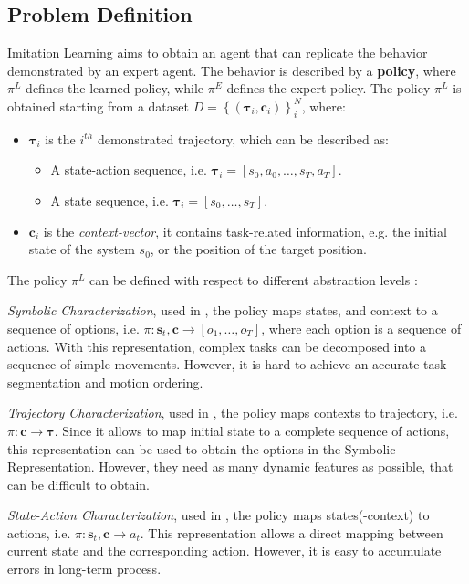 \subsection{Problem Definition}
\label{sec:problem_formulation}
Imitation Learning aims to obtain an agent that can replicate the behavior demonstrated by an expert agent. The behavior is described by a \textbf{policy}, where $\pi^{L}$ defines the learned policy, while $\pi^{E}$ defines the expert policy.
\newline The policy $\pi^{L}$ is obtained starting from a dataset $D=\left \{ \left ( \boldsymbol{\tau}_{i}, \boldsymbol{c}_{i}\right ) \right \}_{i}^{N}$, where:
\begin{itemize}
    \item $\boldsymbol{\tau}_{i}$ is the $i^{th}$ demonstrated trajectory, which can be described as:
        \begin{itemize}
            \item A state-action sequence, i.e. $\boldsymbol{\tau}_{i} = [s_{0}, a_{0}, \dots, s_{T}, a_{T}]$.
            \item A state sequence, i.e. $\boldsymbol{\tau}_{i} = [s_{0}, \dots, s_{T}]$.
        \end{itemize}    
    \item $\boldsymbol{c}_{i}$ is the \textit{context-vector}, it contains task-related information, e.g. the initial state of the system $s_{0}$, or the position of the target position.
\end{itemize}
The policy $\pi^{L}$ can be defined with respect to different abstraction levels \cite{fang2019survey,osa2018algorithmic}:   
\begin{enumerate*}[label=(\textbf{\alph*})]
    \item \textit{Symbolic Characterization}, used in \cite{}, the policy maps states, and context to a sequence of options, i.e. $\pi: \textbf{s}_{t}, \textbf{c} \rightarrow [o_1, \dots, o_T]$, where each option is a sequence of actions. With this representation, complex tasks can be decomposed into a sequence of simple movements. However, it is hard to achieve an accurate task segmentation and motion ordering.
    \item \textit{Trajectory Characterization}, used in \cite{}, the policy maps contexts to trajectory, i.e. $\pi: \mathbf{c} \rightarrow \boldsymbol{\tau}$. Since it allows to map initial state to a complete sequence of actions, this representation can be used to obtain the options in the Symbolic Representation. However, they need as many dynamic features as possible, that can be difficult to obtain.
    \item \textit{State-Action Characterization}, used in \cite{}, the policy maps states(-context) to actions, i.e. $\pi: \textbf{s}_{t}, \textbf{c} \rightarrow a_{t}$. This representation allows a direct mapping between current state and the corresponding action. However, it is easy to accumulate errors in long-term process.
\end{enumerate*} 
